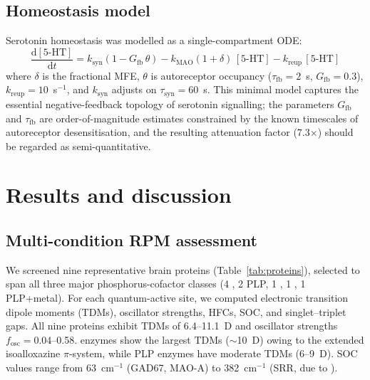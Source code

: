 \documentclass[twoside,twocolumn,9pt]{article}
\begin{document}
\subsection{Homeostasis model}

Serotonin homeostasis was modelled as a single-compartment ODE:
\begin{equation}
\frac{\mathrm{d}[\text{5-HT}]}{\mathrm{d}t} = k_\mathrm{syn}(1 - G_\mathrm{fb}\,\theta) - k_\mathrm{MAO}(1+\delta)\,[\text{5-HT}] - k_\mathrm{reup}\,[\text{5-HT}]
\end{equation}
where $\delta$ is the fractional MFE, $\theta$ is  autoreceptor occupancy ($\tau_\mathrm{fb} = 2$~s, $G_\mathrm{fb} = 0.3$), $k_\mathrm{reup} = 10$~s$^{-1}$, and $k_\mathrm{syn}$ adjusts on $\tau_\mathrm{syn} = 60$~s. This minimal model captures the essential negative-feedback topology of serotonin signalling; the parameters $G_\mathrm{fb}$ and $\tau_\mathrm{fb}$ are order-of-magnitude estimates constrained by the known timescales of  autoreceptor desensitisation,\cite{Daws2009} and the resulting attenuation factor (7.3$\times$) should be regarded as semi-quantitative.

\section{Results and discussion}

\subsection{Multi-condition RPM assessment}

We screened nine representative brain proteins (Table~\ref{tab:proteins}), selected to span all three major phosphorus-cofactor classes (4 , 2 PLP, 1 , 1 , 1 PLP+metal). For each quantum-active site, we computed electronic transition dipole moments (TDMs), oscillator strengths, HFCs, SOC, and singlet--triplet gaps. All nine proteins exhibit TDMs of 6.4--11.1~D and oscillator strengths $f_\mathrm{osc} = 0.04$--0.58.  enzymes show the largest TDMs ($\sim$10~D) owing to the extended isoalloxazine $\pi$-system, while PLP enzymes have moderate TDMs (6--9~D). SOC values range from 63~cm$^{-1}$ (GAD67, MAO-A) to 382~cm$^{-1}$ (SRR, due to ).
\end{document}

